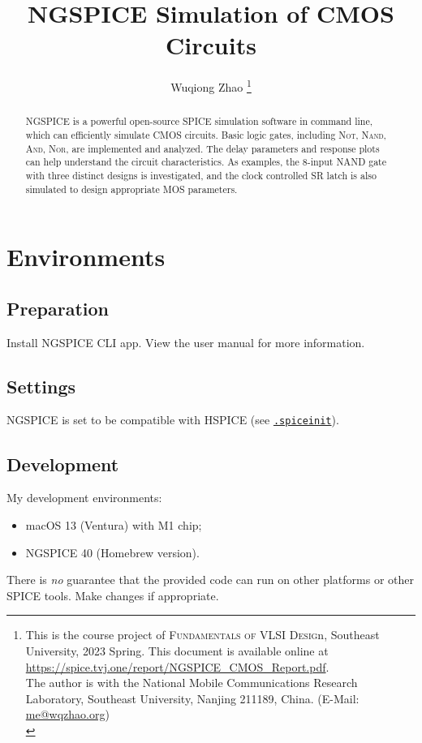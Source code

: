 \documentclass{scrartcl}
\title{NGSPICE Simulation of CMOS Circuits}
\author{Wuqiong Zhao%
  \thanks{\>
    This is the course project of \textsc{Fundamentals of VLSI Desig}n, Southeast University, 2023 Spring.
    This document is available online at \url{https://spice.tvj.one/report/NGSPICE_CMOS_Report.pdf}.\\
    The author is with the National Mobile Communications Research Laboratory,
    Southeast University, Nanjing 211189, China. (E-Mail: \href{mailto:me@wqzhao.org}{me@wqzhao.org})\\
  }}
\begin{document}
  \maketitle

  \begin{abstract}
    NGSPICE is a powerful open-source SPICE simulation software in command line,
    which can efficiently simulate CMOS circuits.
    Basic logic gates, including \textsc{Not}, \textsc{Nand}, \textsc{And}, \textsc{Nor}, are implemented and analyzed.
    The delay parameters and response plots can help understand the circuit characteristics.
    As examples, the 8-input NAND gate with three distinct designs is investigated,
    and the clock controlled SR latch is also simulated to design appropriate MOS parameters.
  \end{abstract}

  \tableofcontents


  \section{Environments}

    \subsection{Preparation}
      Install NGSPICE \cite{ngspice} CLI app.
      View the user manual \cite{manual} for more information.

    \subsection{Settings}
      NGSPICE is set to be compatible with HSPICE (see \href{https://github.com/Teddy-van-Jerry/ngspice-cmos/blob/master/.spiceinit}{\texttt{.spiceinit}}).

    \subsection{Development}
      My development environments:
      \begin{itemize}
        \item macOS 13 (Ventura) with M1 chip;
        \item NGSPICE 40 (Homebrew version).
      \end{itemize}
      There is \textit{no} guarantee that the provided code can run on other platforms or other SPICE tools.
      Make changes if appropriate.
\end{document}
